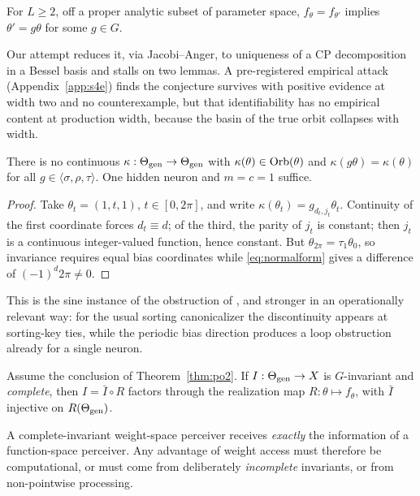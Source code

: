 \begin{conjecture}\label{conj:deep}
For $L\ge2$, off a proper analytic subset of parameter space, $f_\theta = f_{\theta'}$ implies
$\theta' = g\theta$ for some $g\in G$.
\end{conjecture}

Our attempt reduces it, via Jacobi--Anger, to uniqueness of a CP decomposition in a Bessel basis
and stalls on two lemmas. A pre-registered empirical attack (Appendix~\ref{app:s4e}) finds the
conjecture survives with positive evidence at width two and no counterexample, but that
identifiability has no empirical content at production width, because the basin of the true orbit
collapses with width.

\begin{proposition}\label{prop:po5}
There is no continuous $\kappa : \Theta_{\mathrm{gen}} \to \Theta_{\mathrm{gen}}$ with $\kappa(\theta) \in \operatorname{Orb}(\theta)$ and
$\kappa(g\theta) = \kappa(\theta)$ for all $g \in \langle\sigma,\rho,\tau\rangle$. One hidden neuron
and $m=c=1$ suffice.
\end{proposition}

\begin{proof}
Take $\theta_t = (1,t,1)$, $t\in[0,2\pi]$, and write $\kappa(\theta_t) = g_{d_t,j_t}\theta_t$.
Continuity of the first coordinate forces $d_t \equiv d$; of the third, the parity of $j_t$ is
constant; then $j_t$ is a continuous integer-valued function, hence constant. But
$\theta_{2\pi} = \tau_1\theta_0$, so invariance requires equal bias coordinates while
\eqref{eq:normalform} gives a difference of $(-1)^d 2\pi \neq 0$.
\end{proof}

This is the sine instance of the obstruction of \citet{dym2024impossibility}, and stronger in an
operationally relevant way: for the usual sorting canonicalizer the discontinuity appears at
sorting-key ties, while the periodic bias direction produces a loop obstruction already for a single
neuron.

\begin{proposition}\label{prop:po6}
Assume the conclusion of Theorem~\ref{thm:po2}. If $I : \Theta_{\mathrm{gen}} \to X$ is $G$-invariant and
\emph{complete}, then $I = \bar I \circ R$ factors through the realization map
$R:\theta \mapsto f_\theta$, with $\bar I$ injective on $R(\Theta_{\mathrm{gen}})$.
\end{proposition}

\begin{corollary}\label{cor:ceiling}
A complete-invariant weight-space perceiver receives \emph{exactly} the information of a
function-space perceiver. Any advantage of weight access must therefore be computational, or must
come from deliberately \emph{incomplete} invariants, or from non-pointwise processing.
\end{corollary}

